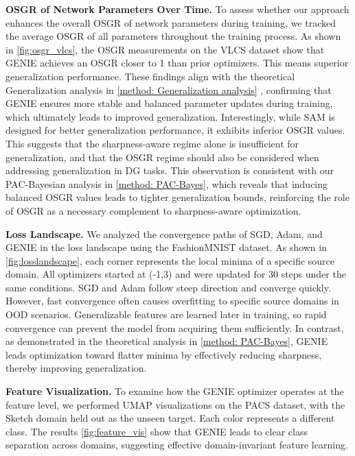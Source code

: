 \documentclass{article}
\theoremstyle{plain}
\theoremstyle{definition}
\theoremstyle{remark}
\begin{document}
\textbf{OSGR of Network Parameters Over Time.} To assess whether our approach enhances the overall OSGR of network parameters during training, we tracked the average OSGR of all parameters throughout the training process. As shown in \cref{fig:osgr_vlcs}, the OSGR measurements on the VLCS dataset show that GENIE achieves an OSGR closer to 1 than prior optimizers. This means superior generalization performance. These findings align with the theoretical Generalization analysis in \cref{method: Generalization analysis} , confirming that GENIE ensures more stable and balanced parameter updates during training, which ultimately leads to improved generalization. Interestingly, while SAM is designed for better generalization performance, it exhibits inferior OSGR values. This suggests that the sharpness-aware regime alone is insufficient for generalization, and that the OSGR regime should also be considered when addressing generalization in DG tasks. This observation is consistent with our PAC-Bayesian analysis in \cref{method: PAC-Bayes}, which reveals that inducing balanced OSGR values leads to tighter generalization bounds, reinforcing the role of OSGR as a necessary complement to sharpness-aware optimization.

\textbf{Loss Landscape.}
We analyzed the convergence paths of SGD, Adam, and GENIE in the loss landscape using the FashionMNIST dataset\cite{Fashion_MNIST}. As shown in \cref{fig:losslandscape}, each corner represents the local minima of a specific source domain. All optimizers started at (-1,3) and were updated for 30 steps under the same conditions. SGD and Adam follow steep direction and converge quickly. However, fast convergence often causes overfitting to specific source domains in OOD scenarios. Generalizable features are learned later in training\cite{spurious_early,spurious_early_1,spurious_early_2}, so rapid convergence can prevent the model from acquiring them sufficiently. In contrast, as demonstrated in the theoretical analysis in \cref{method: PAC-Bayes}, GENIE leads optimization toward flatter minima by effectively reducing sharpness, thereby improving generalization\cite{sam}.

\textbf{Feature Visualization.}
To examine how the GENIE optimizer operates at the feature level, we performed UMAP visualizations\cite{umap} on the PACS dataset, with the Sketch domain held out as the unseen target. Each color represents a different class. The results \cref{fig:feature_vis} show that GENIE leads to clear class separation across domains, suggesting effective domain-invariant feature learning.
\end{document}
